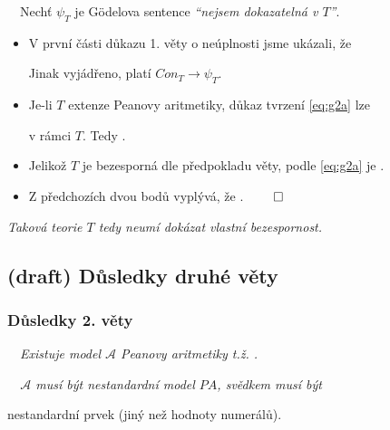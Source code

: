     \smallskip
    
    \ \ Nechť $\psi_T$ je Gödelova sentence {\it ``nejsem dokazatelná v $T$''}.
    \begin{itemize}
    \item V první části důkazu 1. věty o neúplnosti jsme ukázali, že

    

    Jinak vyjádřeno, platí $Con_T\to \psi_T$.

    
    \item Je-li $T$ extenze Peanovy aritmetiky, důkaz tvrzení \eqref{eq:g2a} lze 

    
    v rámci $T$. Tedy .

    
    \item Jelikož $T$ je bezesporná dle předpokladu věty, podle \eqref{eq:g2a} je
    .

    
    \item Z předchozích dvou bodů vyplývá, že . $\qed$
    \end{itemize}
    \smallskip
    
    {\it {} Taková teorie $T$ tedy neumí dokázat vlastní bezespornost.}
    
    


\subsection{(draft) Důsledky druhé věty}\todo

\subsubsection*{Důsledky 2. věty}
    \ \ {\it Existuje model $\mathcal{A}$ Peanovy aritmetiky t.ž. .}
    \medskip
    
    {\it {}\ \ $\mathcal{A}$ musí být nestandardní model $PA$, svědkem musí být
    \smallskip
    
    nestandardní prvek (jiný než hodnoty numerálů).}
    \bigskip
    

